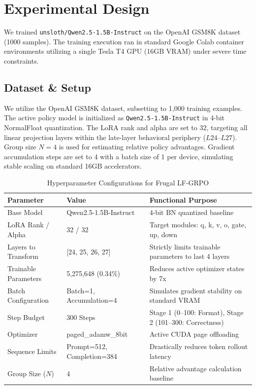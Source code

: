 \documentclass[11pt]{article}
\begin{document}
\section{Experimental Design}

We trained \texttt{unsloth/Qwen2.5-1.5B-Instruct} on the OpenAI GSM8K dataset (1000 samples). The training execution ran in standard Google Colab container environments utilizing a single Tesla T4 GPU (16GB VRAM) under severe time constraints.

\subsection{Dataset \& Setup}
We utilize the OpenAI GSM8K dataset, subsetting to 1,000 training examples. The active policy model is initialized as \texttt{Qwen2.5-1.5B-Instruct} in 4-bit NormalFloat quantization. The LoRA rank and alpha are set to $32$, targeting all linear projection layers within the late-layer behavioral periphery ($L24$--$L27$). Group size $N=4$ is used for estimating relative policy advantages. Gradient accumulation steps are set to 4 with a batch size of 1 per device, simulating stable scaling on standard 16GB accelerators.

\begin{table}[h]
\centering
\caption{Hyperparameter Configurations for Frugal LF-GRPO}
\label{tab:hyperparams}
\begin{tabular}{lll}
\toprule
\textbf{Parameter} & \textbf{Value} & \textbf{Functional Purpose} \\
\midrule
Base Model & Qwen2.5-1.5B-Instruct & 4-bit BN quantized baseline \\
LoRA Rank / Alpha & 32 / 32 & Target modules: q, k, v, o, gate, up, down \\
Layers to Transform & [24, 25, 26, 27] & Strictly limits trainable parameters to last 4 layers \\
Trainable Parameters & 5,275,648 (0.34\%) & Reduces active optimizer states by 7x \\
Batch Configuration & Batch=1, Accumulation=4 & Simulates gradient stability on standard VRAM \\
Step Budget & 300 Steps & Stage 1 (0--100: Format), Stage 2 (101--300: Correctness) \\
Optimizer & paged\_adamw\_8bit & Active CUDA page offloading \\
Sequence Limits & Prompt=512, Completion=384 & Drastically reduces token rollout latency \\
Group Size ($N$) & 4 & Relative advantage calculation baseline \\
\bottomrule
\end{tabular}
\end{table}
\end{document}
